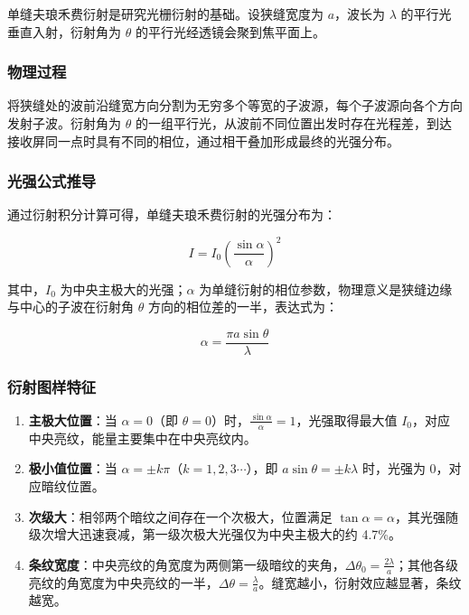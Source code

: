 \documentclass[12pt,a4paper]{ctexrep}
\begin{document}
单缝夫琅禾费衍射是研究光栅衍射的基础。设狭缝宽度为 $a$，波长为 $\lambda$ 的平行光垂直入射，衍射角为 $\theta$ 的平行光经透镜会聚到焦平面上。

\subsubsection{物理过程}

将狭缝处的波前沿缝宽方向分割为无穷多个等宽的子波源，每个子波源向各个方向发射子波。衍射角为 $\theta$ 的一组平行光，从波前不同位置出发时存在光程差，到达接收屏同一点时具有不同的相位，通过相干叠加形成最终的光强分布。

\subsubsection{光强公式推导}

通过衍射积分计算可得，单缝夫琅禾费衍射的光强分布为：

\begin{equation*}
I={I}_{0}{\left( \frac{\sin{\alpha}}{\alpha} \right)}^{2}
\end{equation*}

其中，${I}_{0}$ 为中央主极大的光强；$\alpha$ 为单缝衍射的相位参数，物理意义是狭缝边缘与中心的子波在衍射角 $\theta$ 方向的相位差的一半，表达式为：

\begin{equation*}
\alpha=\frac{\pi a\sin \theta}{\lambda}
\end{equation*}

\subsubsection{衍射图样特征}

\begin{enumerate}[label=\arabic*., leftmargin=2em, itemsep=0pt]
\item \textbf{主极大位置}：当 $\alpha=0$（即 $\theta=0$）时，$\frac{\sin{\alpha}}{\alpha}=1$，光强取得最大值 ${I}_{0}$，对应中央亮纹，能量主要集中在中央亮纹内。
\item \textbf{极小值位置}：当 $\alpha=\pm k\pi$（$k=1,2,3\cdots$），即 $a\sin \theta=\pm k\lambda$ 时，光强为 0，对应暗纹位置。
\item \textbf{次级大}：相邻两个暗纹之间存在一个次极大，位置满足 $\tan \alpha=\alpha$，其光强随级次增大迅速衰减，第一级次极大光强仅为中央主极大的约 4.7\%。
\item \textbf{条纹宽度}：中央亮纹的角宽度为两侧第一级暗纹的夹角，$\Delta{\theta}_{0}=\frac{2\lambda}{a}$；其他各级亮纹的角宽度为中央亮纹的一半，$\Delta\theta=\frac{\lambda}{a}$。缝宽越小，衍射效应越显著，条纹越宽。
\end{enumerate}
\end{document}
